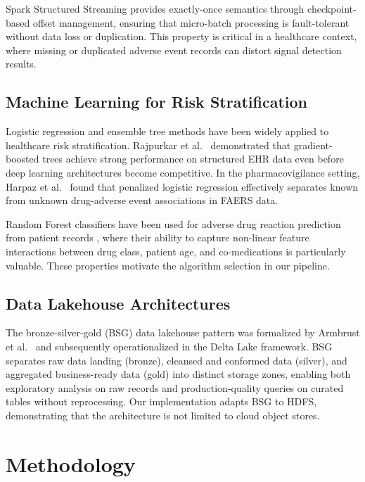 \documentclass[conference]{IEEEtran}
\begin{document}
Spark Structured Streaming \cite{armbrust2018} provides exactly-once semantics through checkpoint-based offset management, ensuring that micro-batch processing is fault-tolerant without data loss or duplication. This property is critical in a healthcare context, where missing or duplicated adverse event records can distort signal detection results.

\subsection{Machine Learning for Risk Stratification}

Logistic regression and ensemble tree methods have been widely applied to healthcare risk stratification. Rajpurkar et al.\ \cite{chexnet} demonstrated that gradient-boosted trees achieve strong performance on structured EHR data even before deep learning architectures become competitive. In the pharmacovigilance setting, Harpaz et al.\ \cite{harpaz2012} found that penalized logistic regression effectively separates known from unknown drug-adverse event associations in FAERS data.

Random Forest classifiers have been used for adverse drug reaction prediction from patient records \cite{rf_adr}, where their ability to capture non-linear feature interactions between drug class, patient age, and co-medications is particularly valuable. These properties motivate the algorithm selection in our pipeline.

\subsection{Data Lakehouse Architectures}

The bronze-silver-gold (BSG) data lakehouse pattern was formalized by Armbrust et al.\ \cite{armbrust2020} and subsequently operationalized in the Delta Lake framework. BSG separates raw data landing (bronze), cleansed and conformed data (silver), and aggregated business-ready data (gold) into distinct storage zones, enabling both exploratory analysis on raw records and production-quality queries on curated tables without reprocessing. Our implementation adapts BSG to HDFS, demonstrating that the architecture is not limited to cloud object stores.

\section{Methodology}
\end{document}
